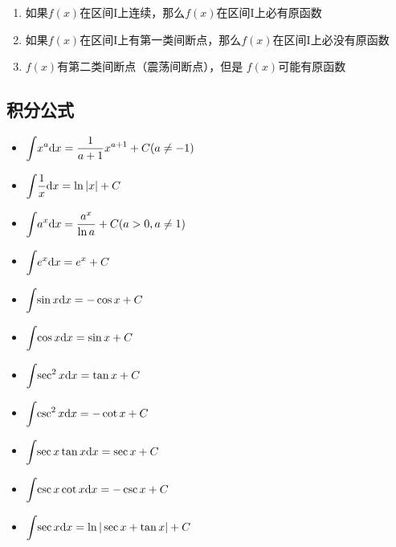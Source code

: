 \begin{enumerate}
    \item 如果$f(x)$在区间I上连续，那么$f(x)$在区间I上必有原函数
    \item 如果$f(x)$在区间I上有第一类间断点，那么$f(x)$在区间I上必没有原函数
    \item $f(x)$有第二类间断点（震荡间断点），但是 $f(x)$可能有原函数
\end{enumerate}

\subsection{积分公式}

\begin{multicols}{2}
    \begin{itemize}
    \item $ \displaystyle\int_{}\hspace{.2em} x^{a}\mathrm{d}x=\frac{1}{a+1}x^{a+1}+C(a\neq -1) $
    \item $ \displaystyle\int_{}\hspace{.2em} \frac{1}{x}\mathrm{d}x=\ln |x|+C $
    \item $ \displaystyle\int_{}\hspace{.2em} a^{x}\mathrm{d}x=\frac{a^{x}}{\ln a}+C(a>0, a\neq 1) $
    \item $ \displaystyle\int_{}\hspace{.2em}e^{x}\mathrm{d}x=e^{x}+C $
    \item $ \displaystyle\int_{}\hspace{.2em}\sin x \mathrm{d}x=-\cos x+C $
    \item $ \displaystyle\int_{}\hspace{.2em}\cos x \mathrm{d}x=\sin x+C $
    \item $ \displaystyle\int_{}\hspace{.2em}\sec^{2}x \mathrm{d}x=\tan x+C $
    \item $ \displaystyle\int_{}\hspace{.2em}\csc^{2}x \mathrm{d}x=-\cot x+C $
    \item $ \displaystyle\int_{}\hspace{.2em}\sec x\tan x \mathrm{d}x=\sec x+C $
    \item $ \displaystyle\int_{}\hspace{.2em}\csc x\cot x \mathrm{d}x=-\csc x+C $
    \item $ \displaystyle\int_{}\hspace{.2em}\sec x \mathrm{d}x=\ln |\sec x+\tan x|+C $

\end{itemize}
\end{multicols}
